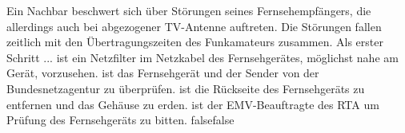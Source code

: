     {Ein Nachbar beschwert sich über Störungen seines Fernsehempfängers, die allerdings auch bei abgezogener TV-Antenne auftreten. Die Störungen fallen zeitlich mit den Übertragungszeiten des Funkamateurs zusammen. Als erster Schritt ...}
    {ist ein Netzfilter im Netzkabel des Fernsehgerätes, möglichst nahe am Gerät, vorzusehen.}
    {ist das Fernsehgerät und der Sender von der Bundesnetzagentur zu überprüfen.}
    {ist die Rückseite des Fernsehgeräts zu entfernen und das Gehäuse zu erden.}
    {ist der EMV-Beauftragte des RTA um Prüfung des Fernsehgeräts zu bitten.}
    {false}{false}